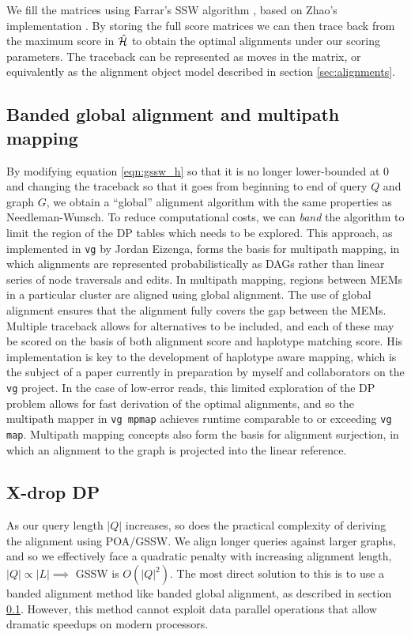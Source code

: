 We fill the matrices using Farrar's SSW algorithm \cite{farrar2007striped}, based on Zhao's implementation \cite{zhao2013ssw}.
By storing the full score matrices we can then trace back from the maximum score in $\hat{\cal H}$ to obtain the optimal alignments under our scoring parameters.
The traceback can be represented as moves in the matrix, or equivalently as the alignment object model described in section \ref{sec:alignments}.

\subsection{Banded global alignment and multipath mapping}
\label{sec:banded_global}

By modifying equation \ref{eqn:gssw_h} so that it is no longer lower-bounded at 0 and changing the traceback so that it goes from beginning to end of query $Q$ and graph $G$, we obtain a ``global'' alignment algorithm with the same properties as Needleman-Wunsch.
To reduce computational costs, we can \emph{band} the algorithm to limit the region of the DP tables which needs to be explored.
This approach, as implemented in {\tt vg} by Jordan Eizenga, forms the basis for multipath mapping, in which alignments are represented probabilistically as DAGs rather than linear series of node traversals and edits.
In multipath mapping, regions between MEMs in a particular cluster are aligned using global alignment.
The use of global alignment ensures that the alignment fully covers the gap between the MEMs.
Multiple traceback allows for alternatives to be included, and each of these may be scored on the basis of both alignment score and haplotype matching score.
His implementation is key to the development of haplotype aware mapping, which is the subject of a paper currently in preparation by myself and collaborators on the {\tt vg} project.
In the case of low-error reads, this limited exploration of the DP problem allows for fast derivation of the optimal alignments, and so the multipath mapper in {\tt vg mpmap} achieves runtime comparable to or exceeding {\tt vg map}.
Multipath mapping concepts also form the basis for alignment surjection, in which an alignment to the graph is projected into the linear reference.

\subsection{X-drop DP}

As our query length $|Q|$ increases, so does the practical complexity of deriving the alignment using POA/GSSW.
We align longer queries against larger graphs, and so we effectively face a quadratic penalty with increasing alignment length, $|Q| \propto |L| \implies$ GSSW is $O(|Q|^2)$.
The most direct solution to this is to use a banded alignment method like banded global alignment, as described in section \ref{sec:banded_global}.
However, this method cannot exploit data parallel operations that allow dramatic speedups on modern processors.

